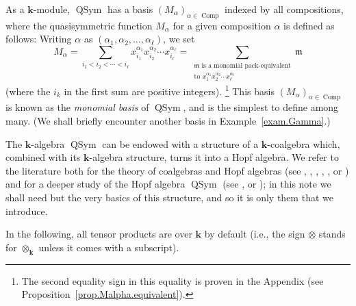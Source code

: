 \documentclass[numbers=enddot,12pt,final,onecolumn,notitlepage,abstracton]{scrartcl}
\theoremstyle{definition}
\let\sumnonlimits\sum
\renewcommand{\sum}{\sumnonlimits\limits}
\newenvironment{verlong}{}{}
\newcommand{\kk}{{\mathbf{k}}}
\newcommand{\Comp}{{\operatorname{Comp}}}
\newcommand{\QSym}{{\operatorname{QSym}}}
\begin{document}
As a $\kk$-module, $\QSym$ has a basis
$\left(M_\alpha\right)_{\alpha \in \Comp}$ indexed by all
compositions, where the quasisymmetric function $M_\alpha$ for a
given composition $\alpha$ is defined as follows: Writing $\alpha$
as $\left(\alpha_1, \alpha_2, \ldots, \alpha_\ell\right)$, we set
\[
M_\alpha
= \sum_{i_1 < i_2 < \cdots < i_\ell}
 x_{i_1}^{\alpha_1} x_{i_2}^{\alpha_2} \cdots x_{i_\ell}^{\alpha_\ell}
= \sum_{\substack{\mathfrak{m}\text{ is a monomial pack-equivalent} \\
                  \text{to }
                  x_1^{\alpha_1} x_2^{\alpha_2} \cdots x_\ell^{\alpha_\ell}}}
  \mathfrak{m}
\]
(where the $i_k$ in the first sum are positive integers).
\begin{verlong}
\footnote{
The second equality sign in this equality is proven
in the Appendix (see
Proposition~\ref{prop.Malpha.equivalent}).
}
\end{verlong}
This
basis $\left(M_\alpha\right)_{\alpha \in \Comp}$ is known as the
\textit{monomial basis} of $\QSym$, and is the simplest to
define among many. (We shall briefly encounter another basis in
Example~\ref{exam.Gamma}.)

The $\kk$-algebra $\QSym$ can be endowed with a structure of a
$\kk$-coalgebra which, combined with its $\kk$-algebra structure,
turns it into a Hopf algebra. We refer to the literature both for
the theory of coalgebras and Hopf algebras
(see
\cite{Montg-Hopf}, \cite[\S 1]{Reiner}, \cite[\S 1-\S 2]{Manchon-HA},
\cite{Abe-HA}, \cite{Sweedler-HA}, \cite{Dasca-HA} or
\cite[Chapter 7]{Fresse-Op})
and for a deeper study of the Hopf algebra $\QSym$ (see
\cite{Malve-Thesis}, \cite[Chapter 6]{HGK} or
\cite[\S 5]{Reiner}); in this note we shall need but the very
basics of this structure, and so it is only them that we introduce.

In the following, all tensor products are over $\kk$ by
default (i.e., the sign $\otimes$ stands for $\otimes_{\kk}$ unless
it comes with a subscript).
\end{document}
